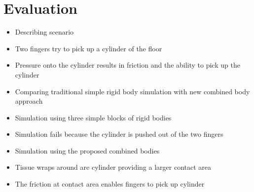 \chapter{Evaluation}
\label{cha:evaluation}

\begin{itemize}
\item Describing scenario
\item Two fingers try to pick up a cylinder of the floor
\item Pressure onto the cylinder results in friction and the ability to pick up the cylinder
\item Comparing traditional simple rigid body simulation with new combined body approach
\item Simulation using three simple blocks of rigid bodies
\item Simulation fails because the cylinder is pushed out of the two fingers
\item Simulation using the proposed combined bodies
\item Tissue wraps around are cylinder providing a larger contact area
\item The friction at contact area enables fingers to pick up cylinder
\end{itemize}